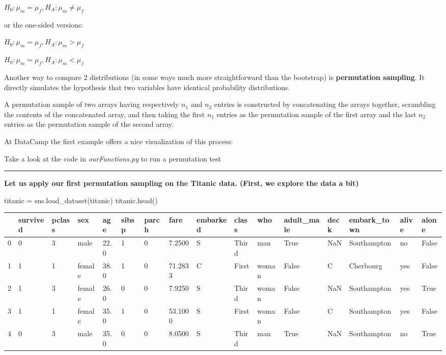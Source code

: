 \documentclass[
  letterpaper,
  DIV=11,
  numbers=noendperiod]{scrreprt}
\newenvironment{Shaded}{\begin{snugshade}}{\end{snugshade}}
\newcommand{\NormalTok}[1]{\textcolor[rgb]{0.00,0.23,0.31}{#1}}
\newcommand{\OperatorTok}[1]{\textcolor[rgb]{0.37,0.37,0.37}{#1}}
\newcommand{\StringTok}[1]{\textcolor[rgb]{0.13,0.47,0.30}{#1}}
\begin{document}
\(H_0: \mu_m = \mu_f, H_A: \mu_m \neq \mu_f\)

or the one-sided versions:

\(H_0: \mu_m = \mu_f, H_A: \mu_m > \mu_f\)

\(H_0: \mu_m = \mu_f, H_A: \mu_m < \mu_f\)

Another way to compare 2 distributions (in some ways much more
straightforward than the bootstrap) is \textbf{permutation sampling}. It
directly simulates the hypothesis that two variables have identical
probability distributions.

A permutation sample of two arrays having respectively \(n_1\) and
\(n_2\) entries is constructed by concatenating the arrays together,
scrambling the contents of the concatenated array, and then taking the
first \(n_1\) entries as the permutation sample of the first array and
the last \(n_2\) entries as the permutation sample of the second array.

At DataCamp the first example offers a nice visualization of this
process:

Take a look at the code in \emph{ourFunctions.py} to run a permutation
test

\begin{center}\rule{0.5\linewidth}{0.5pt}\end{center}

\textbf{Let us apply our first permutation sampling on the Titanic data.
(First, we explore the data a bit)}

\begin{Shaded}
\begin{Highlighting}[]
\NormalTok{titanic }\OperatorTok{=}\NormalTok{ sns.load\_dataset(}\StringTok{\textquotesingle{}titanic\textquotesingle{}}\NormalTok{)}
\NormalTok{titanic.head()}
\end{Highlighting}
\end{Shaded}

\begin{longtable}[]{@{}llllllllllllllll@{}}
\toprule()
& survived & pclass & sex & age & sibsp & parch & fare & embarked &
class & who & adult\_male & deck & embark\_town & alive & alone \\
\midrule()
\endhead
0 & 0 & 3 & male & 22.0 & 1 & 0 & 7.2500 & S & Third & man & True & NaN
& Southampton & no & False \\
1 & 1 & 1 & female & 38.0 & 1 & 0 & 71.2833 & C & First & woman & False
& C & Cherbourg & yes & False \\
2 & 1 & 3 & female & 26.0 & 0 & 0 & 7.9250 & S & Third & woman & False &
NaN & Southampton & yes & True \\
3 & 1 & 1 & female & 35.0 & 1 & 0 & 53.1000 & S & First & woman & False
& C & Southampton & yes & False \\
4 & 0 & 3 & male & 35.0 & 0 & 0 & 8.0500 & S & Third & man & True & NaN
& Southampton & no & True \\
\bottomrule()
\end{longtable}
\end{document}
